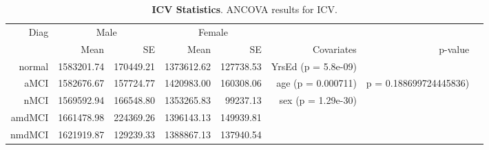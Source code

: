 \documentclass[12pt]{article}\usepackage[]{graphicx}\usepackage[]{color}
\newcommand\T{\rule{0pt}{2.6ex}}
\begin{document}
\newpage
\begin{table}[h]
	\centering
	\footnotesize
	\begin{tabular}{rrrrrrrr}
	\hline
	Diag\T & \multicolumn{2}{c}{Male} & \multicolumn{2}{c}{Female} & & &  \\
      	&  Mean & SE                & Mean & SE                  & Covariates & p-value & \\ \hline
  \hline
normal & 1583201.74 & 170449.21 & 1373612.62 & 127738.53 & YrsEd      (p = 5.8e-09) &  \\ 
  aMCI & 1582676.67 & 157724.77 & 1420983.00 & 160308.06 & age        (p = 0.000711) & p = 0.188699724445836) \\ 
  nMCI & 1569592.94 & 166548.80 & 1353265.83 & 99237.13 & sex        (p = 1.29e-30) &  \\ 
  amdMCI & 1661478.98 & 224369.26 & 1396143.13 & 149939.81 &  &  \\ 
  nmdMCI & 1621919.87 & 129239.33 & 1388867.13 & 137940.54 &  &  \\ 
   \hline

  \end{tabular}
	\caption{\textbf{ICV Statistics}.  ANCOVA results for ICV.}
	\label{Wave1.ICV.stats}
\end{table}
\end{document}
